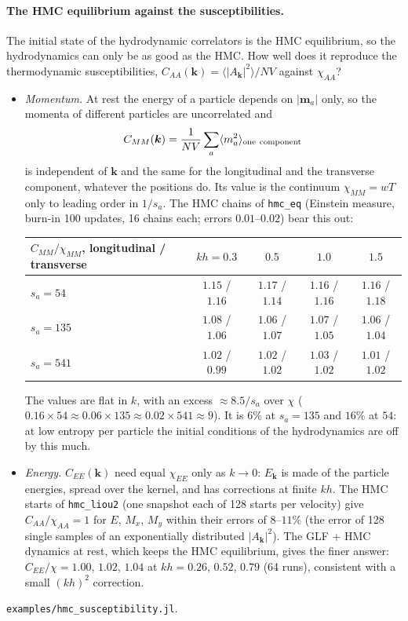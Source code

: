 \documentclass[11pt,aps,preprint,nofootinbib,superscriptaddress,tightenlines]{revtex4-2}
\def\st{\begin{equation}}
\def\stp{\end{equation}}
\let\oldparagraph\paragraph
\renewcommand{\paragraph}{\par\bigskip\oldparagraph}
\begin{document}
\paragraph{The HMC equilibrium against the susceptibilities.}  The initial state of the hydrodynamic correlators is the HMC
equilibrium, so the hydrodynamics can only be as good as the HMC.  How well does it reproduce the thermodynamic susceptibilities, $C_{AA}(\bm k)
=\langle|A_{\bm k}|^2\rangle/NV$ against $\chi_{AA}$?
\begin{itemize}
\item \emph{Momentum.}  At rest the energy of a particle depends on $|\bm m_a|$ only, so the momenta of different particles are uncorrelated and
  \st
  C_{MM}(\bm k)=\frac{1}{NV}\sum_a\langle m_a^2\rangle_{\rm one\ component}
  \stp
  is independent of $\bm k$ and the same for the longitudinal and the transverse component, whatever the positions do.  Its value is the
  continuum $\chi_{MM}=wT$ only to leading order in $1/s_a$.  The HMC chains of \texttt{hmc\_eq} (Einstein measure, burn-in 100 updates, 16
  chains each; errors $0.01$--$0.02$) bear this out:
  \begin{center}
  \begin{tabular}{lcccc}
  \hline
  $C_{MM}/\chi_{MM}$, longitudinal / transverse & $kh=0.3$ & $0.5$ & $1.0$ & $1.5$ \\ \hline
  $s_a=54$ & $1.15$ / $1.16$ & $1.17$ / $1.14$ & $1.16$ / $1.16$ & $1.16$ / $1.18$ \\
  $s_a=135$ & $1.08$ / $1.06$ & $1.06$ / $1.07$ & $1.07$ / $1.05$ & $1.06$ / $1.04$ \\
  $s_a=541$ & $1.02$ / $0.99$ & $1.02$ / $1.02$ & $1.03$ / $1.02$ & $1.01$ / $1.02$ \\
  \hline
  \end{tabular}
  \end{center}
  The values are flat in $k$, with an excess $\approx8.5/s_a$ over $\chi$ ($0.16\times54\approx0.06\times135\approx0.02\times541\approx9$).  It is
  $6\%$ at $s_a=135$ and $16\%$ at $54$: at low entropy per particle the initial conditions of the hydrodynamics are off by this much.
\item \emph{Energy.}  $C_{EE}(\bm k)$ need equal $\chi_{EE}$ only as $k\to0$: $E_{\bm k}$ is made of the particle energies, spread over the
  kernel, and has corrections at finite $kh$.  The HMC starts of \texttt{hmc\_liou2} (one snapshot each of 128 starts per velocity) give
  $C_{AA}/\chi_{AA}=1$ for $E$, $M_x$, $M_y$ within their errors of $8$--$11\%$ (the error of 128 single samples of an exponentially
  distributed $|A_{\bm k}|^2$).  The GLF + HMC dynamics at rest, which keeps the HMC equilibrium, gives the finer answer: $C_{EE}/\chi=1.00$, $1.02$,
  $1.04$ at $kh=0.26$, $0.52$, $0.79$ (64 runs), consistent with a small $(kh)^2$ correction.
\end{itemize}
\texttt{examples/hmc\_susceptibility.jl}.
\end{document}
